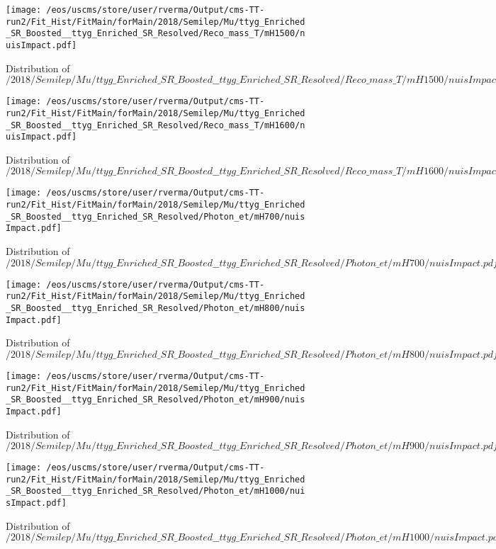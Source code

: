 \begin{figure}
\centering
\texttt{[image: /eos/uscms/store/user/rverma/Output/cms-TT-run2/Fit\_Hist/FitMain/forMain/2018/Semilep/Mu/ttyg\_Enriched\_SR\_Boosted\_\_ttyg\_Enriched\_SR\_Resolved/Reco\_mass\_T/mH1500/nuisImpact.pdf]}
\caption{Distribution of $/2018/Semilep/Mu/ttyg\_Enriched\_SR\_Boosted\_\_ttyg\_Enriched\_SR\_Resolved/Reco\_mass\_T/mH1500/nuisImpact.pdf$}
\end{figure}

\begin{figure}
\centering
\texttt{[image: /eos/uscms/store/user/rverma/Output/cms-TT-run2/Fit\_Hist/FitMain/forMain/2018/Semilep/Mu/ttyg\_Enriched\_SR\_Boosted\_\_ttyg\_Enriched\_SR\_Resolved/Reco\_mass\_T/mH1600/nuisImpact.pdf]}
\caption{Distribution of $/2018/Semilep/Mu/ttyg\_Enriched\_SR\_Boosted\_\_ttyg\_Enriched\_SR\_Resolved/Reco\_mass\_T/mH1600/nuisImpact.pdf$}
\end{figure}

\begin{figure}
\centering
\texttt{[image: /eos/uscms/store/user/rverma/Output/cms-TT-run2/Fit\_Hist/FitMain/forMain/2018/Semilep/Mu/ttyg\_Enriched\_SR\_Boosted\_\_ttyg\_Enriched\_SR\_Resolved/Photon\_et/mH700/nuisImpact.pdf]}
\caption{Distribution of $/2018/Semilep/Mu/ttyg\_Enriched\_SR\_Boosted\_\_ttyg\_Enriched\_SR\_Resolved/Photon\_et/mH700/nuisImpact.pdf$}
\end{figure}

\begin{figure}
\centering
\texttt{[image: /eos/uscms/store/user/rverma/Output/cms-TT-run2/Fit\_Hist/FitMain/forMain/2018/Semilep/Mu/ttyg\_Enriched\_SR\_Boosted\_\_ttyg\_Enriched\_SR\_Resolved/Photon\_et/mH800/nuisImpact.pdf]}
\caption{Distribution of $/2018/Semilep/Mu/ttyg\_Enriched\_SR\_Boosted\_\_ttyg\_Enriched\_SR\_Resolved/Photon\_et/mH800/nuisImpact.pdf$}
\end{figure}

\begin{figure}
\centering
\texttt{[image: /eos/uscms/store/user/rverma/Output/cms-TT-run2/Fit\_Hist/FitMain/forMain/2018/Semilep/Mu/ttyg\_Enriched\_SR\_Boosted\_\_ttyg\_Enriched\_SR\_Resolved/Photon\_et/mH900/nuisImpact.pdf]}
\caption{Distribution of $/2018/Semilep/Mu/ttyg\_Enriched\_SR\_Boosted\_\_ttyg\_Enriched\_SR\_Resolved/Photon\_et/mH900/nuisImpact.pdf$}
\end{figure}

\begin{figure}
\centering
\texttt{[image: /eos/uscms/store/user/rverma/Output/cms-TT-run2/Fit\_Hist/FitMain/forMain/2018/Semilep/Mu/ttyg\_Enriched\_SR\_Boosted\_\_ttyg\_Enriched\_SR\_Resolved/Photon\_et/mH1000/nuisImpact.pdf]}
\caption{Distribution of $/2018/Semilep/Mu/ttyg\_Enriched\_SR\_Boosted\_\_ttyg\_Enriched\_SR\_Resolved/Photon\_et/mH1000/nuisImpact.pdf$}
\end{figure}

